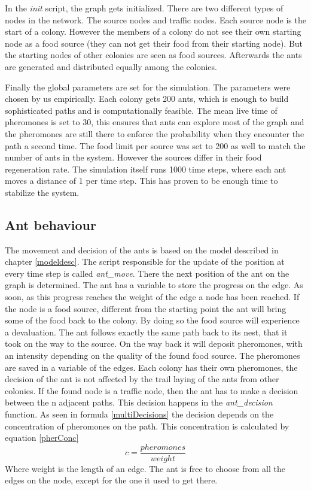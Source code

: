 In the \textit{init} script, the graph gets initialized. There are two different types of nodes in the network. The source nodes and traffic nodes.
Each source node is the start of a colony. However the members of a colony do not see their own starting node as a food source (they can not get their food from their starting node). But the starting nodes of other colonies are seen as food sources. Afterwards the ants are generated and distributed equally among the colonies. 

Finally the global parameters are set for the simulation. The parameters were chosen by us empirically. Each colony gets 200 ants, which is enough to build sophisticated paths and is computationally feasible. The mean live time of pheromones is set to 30, this ensures that ants can explore most of the graph and the pheromones are still there to enforce the probability when they encounter the path a second time. The food limit per source was set to 200 as well to match the number of ants in the system. However the sources differ in their food regeneration rate. The simulation itself runs 1000 time steps, where each ant moves a distance of 1 per time step. This has proven to be enough time to stabilize the system.

\subsection{Ant behaviour}
The movement and decision of the ants is based on the model described in chapter \ref{modeldesc}. The script responsible for the update of the position at every time step is called \textit{ant\_move}. There the next position of the ant on the graph is determined. The ant has a variable to store the progress on the edge. As soon, as this progress reaches the weight of the edge a node has been reached. If the node is a food source, different from the starting point the ant will bring some of the food back to the colony. By doing so the food source will experience a devaluation. The ant follows exactly the same path back to its nest, that it took on the way to the source. On the way back it will deposit pheromones, with an intensity depending on the quality of the found food source. The pheromones are saved in a variable of the edges. Each colony has their own pheromones, the decision of the ant is not affected by the trail laying of the ants from other colonies.
If the found node is a traffic node, then the ant has to make a decision between the n adjacent paths. This decision happens in the \textit{ant\_decision} function. As seen in formula \ref{multiDecisions} the decision depends on the concentration of pheromones on the path. This concentration is calculated by equation \ref{pherConc}
\begin{equation} \label{pherConc}
c = \frac{pheromones}{weight}
\end{equation}
Where weight is the length of an edge. The ant is free to choose from all the edges on the node, except for the one it used to get there.

